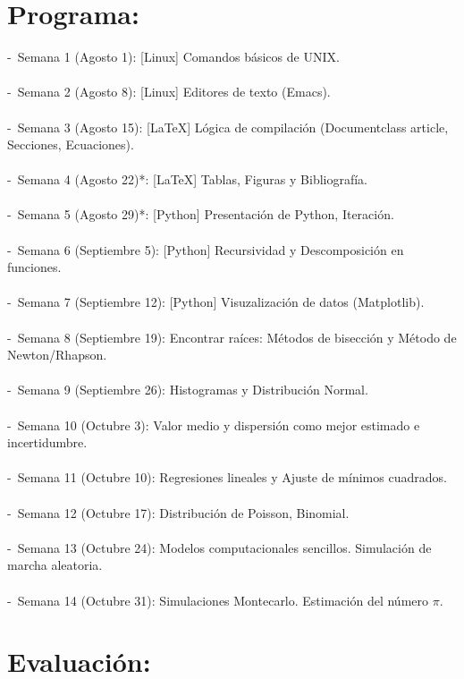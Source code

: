 \documentclass[letterpaper]{article}
\begin{document}
\section*{Programa:}
-\ Semana 1 (Agosto 1): [Linux] Comandos b\'asicos de UNIX. \\
\\
-\ Semana 2 (Agosto 8): [Linux] Editores de texto (Emacs). \\
\\
-\ Semana 3 (Agosto 15): [\LaTeX] L\'ogica de compilaci\'on (Documentclass article, Secciones, Ecuaciones).\\
\\
-\ Semana 4 (Agosto 22)*: [\LaTeX] Tablas, Figuras y Bibliograf\'ia. \\
\\
-\ Semana 5 (Agosto 29)*: [Python] Presentaci\'on de Python, Iteraci\'on. \\
\\
-\ Semana 6 (Septiembre 5): [Python] Recursividad y Descomposici\'on en funciones. \\
\\
-\ Semana 7 (Septiembre 12): [Python] Visuzalizaci\'on de datos (Matplotlib). \\
\\
-\ Semana 8 (Septiembre 19): Encontrar ra\'ices: M\'etodos de bisecci\'on y  M\'etodo de \indent Newton/Rhapson. \\
\\
-\ Semana 9 (Septiembre 26): Histogramas y Distribuci\'on Normal. \\
\\
-\ Semana 10 (Octubre 3): Valor medio y dispersi\'on como mejor estimado e incertidumbre. \\
\\
-\ Semana 11 (Octubre 10): Regresiones lineales y Ajuste de m\'inimos cuadrados. \\
\\
-\ Semana 12 (Octubre 17): Distribuci\'on de Poisson, Binomial. \\
\\
-\ Semana 13 (Octubre 24): Modelos computacionales sencillos. Simulaci\'on de marcha aleatoria. \\
\\
-\ Semana 14 (Octubre 31): Simulaciones Montecarlo.  Estimaci\'on del n\'umero $\pi$. \\


\section*{Evaluaci\'on:}
\end{document}
